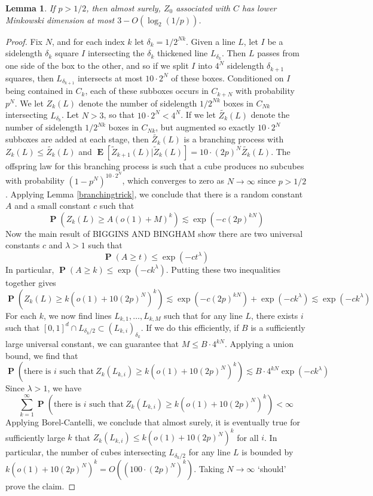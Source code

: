 \documentclass[dvipsnames,letterpaper,12pt]{article}
\numberwithin{equation}{section}
\theoremstyle{plain}
\newtheorem{lemma}{Lemma}
\DeclareMathOperator{\Prob}{\mathbf{P}}
\DeclareMathOperator{\Expect}{\mathbf{E}}
\begin{document}
\begin{lemma}
	If $p > 1/2$, then almost surely, $Z_0$ associated with $C$ has lower Minkowski dimension at most $3 - O(\log_2(1/p))$.
\end{lemma}
\begin{proof}
	Fix $N$, and for each index $k$ let $\delta_k = 1/2^{Nk}$. Given a line $L$, let $I$ be a sidelength $\delta_k$ square $I$ intersecting the $\delta_k$ thickened line $L_{\delta_k}$. Then $L$ passes from one side of the box to the other, and so if we split $I$ into $4^N$ sidelength $\delta_{k+1}$ squares, then $L_{\delta_{k+1}}$ intersects at most $10 \cdot 2^N$ of these boxes. Conditioned on $I$ being contained in $C_k$, each of these subboxes occurs in $C_{k+N}$ with probability $p^N$. We let $Z_k(L)$ denote the number of sidelength $1/2^{Nk}$ boxes in $C_{Nk}$ intersecting $L_{\delta_k}$. Let $N > 3$, so that $10 \cdot 2^N < 4^N$. If we let $\tilde{Z_k}(L)$ denote the number of sidelength $1/2^{Nk}$ boxes in $C_{Nk}$, but augmented so exactly $10 \cdot 2^N$ subboxes are added at each stage, then $\tilde{Z_k}(L)$ is a branching process with $Z_k(L) \leq \tilde{Z_k}(L)$ and $\Expect[\tilde{Z}_{k+1}(L)|\tilde{Z}_k(L)] = 10 \cdot (2p)^N \tilde{Z_k}(L)$. The offspring law for this branching process is such that a cube produces no subcubes with probability $(1 - p^N)^{10 \cdot 2^N}$, which converges to zero as $N \to \infty$ since $p > 1/2$. Applying Lemma \ref{branchingtrick}, we conclude that there is a random constant $A$ and a small constant $c$ such that
	\[ \Prob(Z_k(L) \geq A (o(1) + M)^k) \lesssim \exp(-c (2p)^{kN}) \]
	Now the main result of BIGGINS AND BINGHAM show there are two universal constants $c$ and $\lambda > 1$ such that
	\[ \Prob(A \geq t) \leq \exp(-c t^\lambda) \]
	In particular, $\Prob(A \geq k) \leq \exp(-ck^\lambda)$. Putting these two inequalities together gives
	\[ \Prob(Z_k(L) \geq k(o(1) + 10 (2p)^N)^k) \lesssim \exp(-c (2p)^{kN}) + \exp(-c k^\lambda) \lesssim \exp(-c k^\lambda) \]
	For each $k$, we now find lines $L_{k,1}, \dots, L_{k,M}$ such that for any line $L$, there exists $i$ such that $[0,1]^d \cap L_{\delta_k/2} \subset (L_{k,i})_{\delta_k}$. If we do this efficiently, if $B$ is a sufficiently large universal constant, we can guarantee that $M \leq B \cdot 4^{kN}$. Applying a union bound, we find that
	\[ \Prob \left( \text{there is $i$ such that}\ Z_k(L_{k,i}) \geq k(o(1) + 10 (2p)^N)^k \right) \lesssim B \cdot 4^{kN} \exp(-c k^\lambda) \]
	Since $\lambda > 1$, we have
	\[ \sum_{k = 1}^\infty \Prob \left( \text{there is $i$ such that}\ Z_k(L_{k,i}) \geq k(o(1) + 10 (2p)^N)^k \right) < \infty \]
	Applying Borel-Cantelli, we conclude that almost surely, it is eventually true for sufficiently large $k$ that $Z_k(L_{k,i}) \leq k(o(1) + 10 (2p)^N)^k$ for all $i$. In particular, the number of cubes intersecting $L_{\delta_k/2}$ for any line $L$ is bounded by $k(o(1) + 10 (2p)^N)^k = O((100 \cdot (2p)^N)^k)$. Taking $N \to \infty$ `should' prove the claim.


\end{proof}
\end{document}
